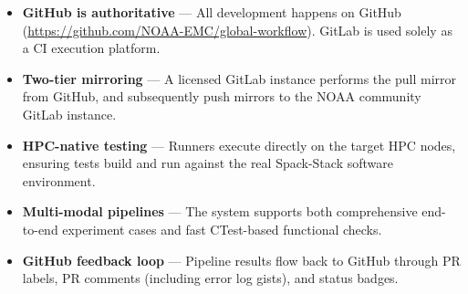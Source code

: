 \documentclass[11pt,letterpaper,twoside]{article}
\begin{document}
\begin{itemize}[leftmargin=1.5em]
  \item \textbf{GitHub is authoritative} --- All development happens on GitHub
    (\url{https://github.com/NOAA-EMC/global-workflow}). GitLab is used solely
    as a CI execution platform.
  \item \textbf{Two-tier mirroring} --- A licensed GitLab instance performs the
    pull mirror from GitHub, and subsequently push mirrors to the NOAA community
    GitLab instance.
  \item \textbf{HPC-native testing} --- Runners execute directly on the target
    HPC nodes, ensuring tests build and run against the real Spack-Stack
    software environment.
  \item \textbf{Multi-modal pipelines} --- The system supports both
    comprehensive end-to-end experiment cases and fast CTest-based functional
    checks.
  \item \textbf{GitHub feedback loop} --- Pipeline results flow back to GitHub
    through PR labels, PR comments (including error log gists), and status
    badges.
\end{itemize}
\end{document}
